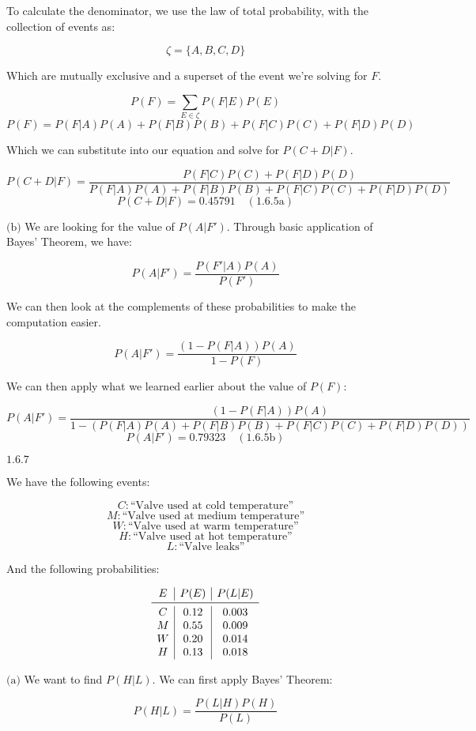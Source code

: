 \documentclass{article}
\newcommand{\problem}[2]{$\boxed{\text{#1.#2}}$}
\newcommand{\subproblem}[3]{$\boxed{\text{(#3)}}$}
\newcommand{\subsolution}[4]{\boxed{#4\quad(\text{#1.#2#3})}}
\begin{document}
To calculate the denominator, we use the law of total probability,
with the collection of events as:

\[
\zeta=\{A,B,C,D\}
\]

Which are mutually exclusive and a superset of the event we're solving
for $F$.

\[
P(F)=\sum\limits_{E\in\zeta}P(F|E)P(E)
\] \[
P(F)=P(F|A)P(A)+P(F|B)P(B)+P(F|C)P(C)+P(F|D)P(D)
\]

Which we can substitute into our equation and solve for $P(C+D|F)$.

\[
P(C+D|F)=\dfrac{P(F|C)P(C)+P(F|D)P(D)}{P(F|A)P(A)+P(F|B)P(B)+P(F|C)P(C)+P(F|D)P(D)}
\] \[
\subsolution{1.6}{5}{a}{P(C+D|F)=0.45791}
\]

%
\subproblem{1.6}{5}{b} We are looking for the value of
$P(A|F')$. Through basic application of Bayes' Theorem, we have:

\[
P(A|F')=\dfrac{P(F'|A)P(A)}{P(F')}
\]

We can then look at the complements of these probabilities to make the
computation easier.

\[
P(A|F')=\dfrac{(1-P(F|A))P(A)}{1-P(F)}
\]

We can then apply what we learned earlier about the value of $P(F)$:

\[
P(A|F')=\dfrac{(1-P(F|A))P(A)}{1-(P(F|A)P(A)+P(F|B)P(B)+P(F|C)P(C)+P(F|D)P(D))}
\] \[
\subsolution{1.6}{5}{b}{P(A|F')=0.79323}
\]

%
\problem{1.6}{7}

We have the following events:

\[
C:\text{``Valve used at cold temperature''}
\] \[
M:\text{``Valve used at medium temperature''}
\] \[
W:\text{``Valve used at warm temperature''}
\] \[
H:\text{``Valve used at hot temperature''}
\] \[
L:\text{``Valve leaks''}
\]

And the following probabilities:

\[
\begin{array}{c|c|c}
E & P(E) & P(L|E) \\
\midrule
C & 0.12 & 0.003 \\
M & 0.55 & 0.009 \\
W & 0.20 & 0.014 \\
H & 0.13 & 0.018 \\
\end{array}
\]

%
\subproblem{1.6}{7}{a} We want to find $P(H|L)$. We can first apply
Bayes' Theorem:

\[
P(H|L)=\dfrac{P(L|H)P(H)}{P(L)}
\]
\end{document}
